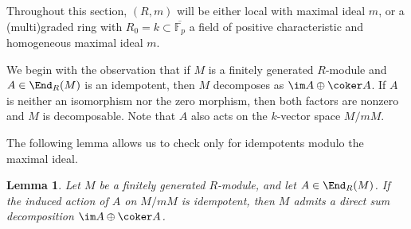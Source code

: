 \documentclass[12pt]{article}
\theoremstyle{theorem}
\numberwithin{thm}{section}
\newtheorem{lem}[thm]{Lemma}
\theoremstyle{definition}
\begin{document}
Throughout this section, $(R,m)$ will be either local with maximal ideal $m$, or a (multi)graded ring with $R_0 = k \subset \overline{\mathbb F_p}$ a field of positive characteristic and homogeneous maximal ideal $m$.

We begin with the observation that if $M$ is a finitely generated $R$-module and $A\in\End_R(M)$ is an idempotent, then $M$ decomposes as $\im A \oplus \coker A$. If $A$ is neither an isomorphism nor the zero morphism, then both factors are nonzero and $M$ is decomposable. Note that $A$ also acts on the $k$-vector space $M/mM$.

The following lemma allows us to check only for idempotents modulo the maximal ideal.

\begin{lem}\label{lem:idemp}
  Let $M$ be a finitely generated $R$-module, and let $A\in\End_R(M)$. If the induced action of $A$ on $M/mM$ is idempotent, then $M$ admits a direct sum decomposition $\im A \oplus \coker A$.
\end{lem}
\end{document}
